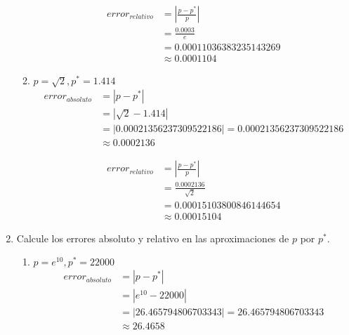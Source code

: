 \documentclass[12pt]{article}
\begin{document}
\begin{enumerate}
\begin{enumerate}[label=\alph*.]
            \[
            \begin{aligned}
                error_{relativo} &= \left| \frac{p - p^{*}}{p}\right| \\
                                 &= \frac{0.0003}{e} \\
                                 &= 0.00011036383235143269\\
                                 &\approx 0.0001104
            \end{aligned}
        \]
        \item \(p = \sqrt{2}, p^{*} = 1.414\)
        \[
            \begin{aligned}
                error_{absoluto} &= \left| p - p^{*}\right| \\
                                 &= \left| \sqrt{2} - 1.414 \right| \\
                                 &= \left|0.00021356237309522186\right| = 0.00021356237309522186 \\
                                 &\approx 0.0002136
            \end{aligned}
            \]
    
            \[
            \begin{aligned}
                error_{relativo} &= \left| \frac{p - p^{*}}{p}\right| \\
                                 &= \frac{0.0002136}{\sqrt{2}} \\
                                 &= 0.00015103800846144654\\
                                 &\approx 0.00015104
            \end{aligned}
        \]
    \end{enumerate}
    \item Calcule los errores absoluto y relativo en las aproximaciones de \(p\) por \(p^{*}\).
    \begin{enumerate}[label=\alph*.]
        \item \(p = e^{10}, p^{*} = 22000\)
        \[
            \begin{aligned}
                error_{absoluto} &= \left| p - p^{*}\right| \\
                                 &= \left| e^{10} - 22000 \right| \\
                                 &= \left|26.465794806703343\right| = 26.465794806703343 \\
                                 &\approx 26.4658
            \end{aligned}
            \]
    

\end{enumerate}
\end{enumerate}
\end{document}
